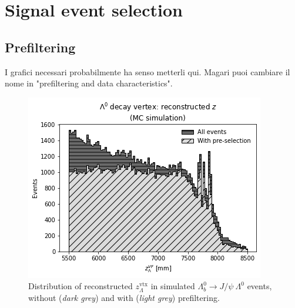 \chapter{Signal event selection}
\label{cap:event_selection}

\section{Prefiltering}
\label{sec:prefilter}
I grafici necessari probabilmente ha senso metterli qui. Magari puoi cambiare il nome in "prefiltering and data characteristics".

\begin{figure}[t]
	\centering
	\includegraphics[width=.6\textwidth]{graphics/04-event_selection/Lambda_endvertex_z.png}
	\caption[Z.]{Distribution of reconstructed $z_\Lambda^\text{vtx}$ in simulated $\Lambda_b^0 \rightarrow J/\psi~\Lambda^0$ events, without (\textit{dark grey}) and with (\textit{light grey}) prefiltering.}
\end{figure}

